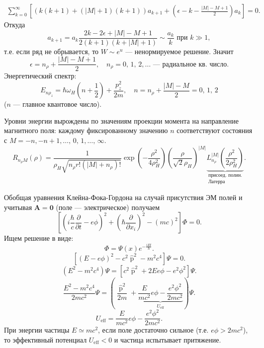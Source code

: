 \documentclass[a4paper]{article}
\begin{document}
\begin{sol}
\begin{enumerate}
\begin{multline*}
\sum_{k=0}^{\infty} \left[ \left( k(k+1)+
\left( |M|+1 \right) (k+1)\right) a_{k+1}+
\left( \epsilon -k - \frac{|M|-M+1}{2} \right) a_k\right] =0
.\end{multline*} 
Откуда
\[
	a_{k+1}= a_k \frac{2k-2\epsilon  +|M|-M+1}{2(k+1)(k+|M|+1)}\sim \frac{a_k}{k} \text{ при }
	k\gg 1
,\] 
т.\:е. если ряд не обрывается, то $W \sim 
e^u$ --- ненормируемое решение. Значит
\[
\epsilon = n_\rho + \frac{|M|-M+1}{2},\quad
n_\rho= 0,\,1,\,2,\ldots \text{ --- радиальное кв. число}
.\] 
Энергетический спектр:
\[
	E_{n \rho_z}= \hbar  \omega_H \left( 
	n+\frac{1}{2}\right) + \frac{p_z^2}{2m},\quad
	n= n_\rho+ \frac{|M|-M}{2}= 0,\,1,\,2
\]
($n$ --- главное квантовое число).

Уровни энергии вырождены по значениям проекции
момента на направление магнитного поля: каждому
фиксированному значению $n$ соответствуют состояния 
с $M=-n,-n+1,\ldots,\,0,\,1,\ldots,\,\infty$.
\[
	R_{n_\rho M}(\rho)=
	\frac{1}{\rho_H \sqrt{n_\rho r! \left( 
	|M|+n_\rho\right) !}} \exp 
	\left( - \frac{\rho^2}{4\rho_H^2} \right) 
	\left( \frac{\rho}{\sqrt{2} \rho_H} \right) 
	^{|M|} \underbrace{L_{n_\rho}^{|M|}\left( 
	\frac{\rho^2}{2\rho_H^2}\right) }_{\substack{\text{присоед. полин.}\\\text{Лагерра}}}
.\] 
\end{enumerate}
\end{sol}
\begin{hiProb}[12]
\end{hiProb}
\begin{sol}
Обобщая уравнения Клейна-Фока-Гордона
на случай присутствия ЭМ полей и учитывая
$\mathbf{A}=\mathbf{0}$ (поле --- электрическое)
получаем
\[
	\left[ \left( i \frac{\hbar}{c}
	\frac{\partial }{\partial t}- e \phi \right) ^2 + \left( \hbar  \frac{\partial }{\partial x_i}  \right) ^2-
(mc)^2\right] \Phi=0
.\] 
Ищем решение в виде:
\[
	\Phi= \Psi(x)e^{-\frac{iEt}{\hbar }}
.\] 
\[
	\left[ \left( E-e\phi \right) ^2-
	c^2 \widehat{\operatorname{p}}^2-
m^2 c^4 \right] \Psi=0
.\] 
\[
	\left( E^2- m^2 c^4 \right)\Psi
	=\left[ c^2 \widehat{\operatorname{p}}^2
	+2 E e \phi - e^2 \phi^2\right] \Psi
.\] 
\[
\frac{E^2 -m^2 c^4}{2mc^2}\Psi=
\left( \frac{\widehat{\operatorname{p}}^2}{2m}
+\underbrace{\frac{E}{mc^2}e \phi- \frac{e^2\phi^2}{2mc^2}}_{U_{\text{eff}}}\right) 
\Psi
.\] 
\[
	U_{\text{eff}}= \frac{E}{mc^2}
	e\phi- \frac{e^2 \phi^2}{2mc^2}
.\] 
При энергии частицы $E \simeq mc^2$, если
поле достаточно сильное (т.\:е. $e\phi >2mc^2$),
то эффективный потенциал $U_{\text{eff}}<0$ и 
частица испытывает притяжение.
\end{sol}
\end{document}
